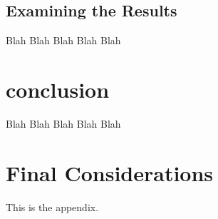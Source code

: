 \documentclass{article}
\begin{document}
    \subsection{Examining the Results}\label{subsec:examineres}
    Blah Blah Blah Blah Blah

    \section{conclusion}\label{sec:conclusion}
    Blah Blah Blah Blah Blah

    \newpage
    
    \label{refs}

    \newpage
    \appendix
    \section{Final Considerations}
    This is the appendix.
\end{document}
